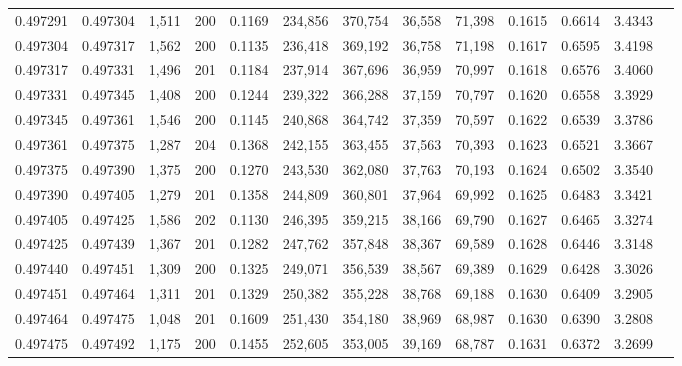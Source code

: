 \begin{tabular}{rrrrrrrrrrrrr}
0.497291 & 0.497304 & 1,511 & 200 &                                     0.1169 & 234,856 & 370,754 &  36,558 &  71,398 & 0.1615 & 0.6614 & 3.4343 \\
0.497304 & 0.497317 & 1,562 & 200 &                                     0.1135 & 236,418 & 369,192 &  36,758 &  71,198 & 0.1617 & 0.6595 & 3.4198 \\
0.497317 & 0.497331 & 1,496 & 201 &                                     0.1184 & 237,914 & 367,696 &  36,959 &  70,997 & 0.1618 & 0.6576 & 3.4060 \\
0.497331 & 0.497345 & 1,408 & 200 &                                     0.1244 & 239,322 & 366,288 &  37,159 &  70,797 & 0.1620 & 0.6558 & 3.3929 \\
0.497345 & 0.497361 & 1,546 & 200 &                                     0.1145 & 240,868 & 364,742 &  37,359 &  70,597 & 0.1622 & 0.6539 & 3.3786 \\
0.497361 & 0.497375 & 1,287 & 204 &                                     0.1368 & 242,155 & 363,455 &  37,563 &  70,393 & 0.1623 & 0.6521 & 3.3667 \\
0.497375 & 0.497390 & 1,375 & 200 &                                     0.1270 & 243,530 & 362,080 &  37,763 &  70,193 & 0.1624 & 0.6502 & 3.3540 \\
0.497390 & 0.497405 & 1,279 & 201 &                                     0.1358 & 244,809 & 360,801 &  37,964 &  69,992 & 0.1625 & 0.6483 & 3.3421 \\
0.497405 & 0.497425 & 1,586 & 202 &                                     0.1130 & 246,395 & 359,215 &  38,166 &  69,790 & 0.1627 & 0.6465 & 3.3274 \\
0.497425 & 0.497439 & 1,367 & 201 &                                     0.1282 & 247,762 & 357,848 &  38,367 &  69,589 & 0.1628 & 0.6446 & 3.3148 \\
0.497440 & 0.497451 & 1,309 & 200 &                                     0.1325 & 249,071 & 356,539 &  38,567 &  69,389 & 0.1629 & 0.6428 & 3.3026 \\
0.497451 & 0.497464 & 1,311 & 201 &                                     0.1329 & 250,382 & 355,228 &  38,768 &  69,188 & 0.1630 & 0.6409 & 3.2905 \\
0.497464 & 0.497475 & 1,048 & 201 &                                     0.1609 & 251,430 & 354,180 &  38,969 &  68,987 & 0.1630 & 0.6390 & 3.2808 \\
0.497475 & 0.497492 & 1,175 & 200 &                                     0.1455 & 252,605 & 353,005 &  39,169 &  68,787 & 0.1631 & 0.6372 & 3.2699 \\

\end{tabular}
